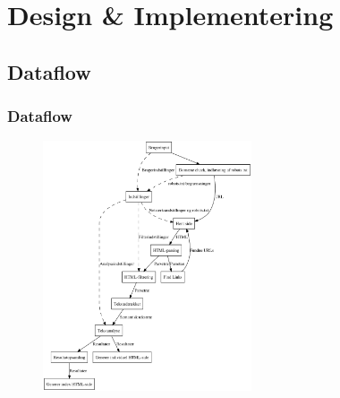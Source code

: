 \documentclass{beamer}
\begin{document}
\section{Design \& Implementering}
\subsection{Dataflow}
\begin{frame}
  \frametitle{Dataflow}
  \begin{figure}
    \includegraphics[width=0.55\textwidth]{endeligtdesignill.pdf}
  \end{figure}
\end{frame}
\end{document}
